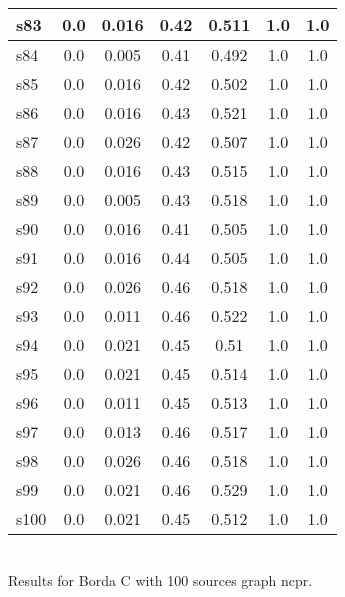 \documentclass{article}
\begin{document}
\begin{tabular}{|l|c|c|c|c|c|c|}
\hline
s83 &0.0 & 0.016 & 0.42 & 0.511 & 1.0 & 1.0\\
\hline
s84 &0.0 & 0.005 & 0.41 & 0.492 & 1.0 & 1.0\\
\hline
s85 &0.0 & 0.016 & 0.42 & 0.502 & 1.0 & 1.0\\
\hline
s86 &0.0 & 0.016 & 0.43 & 0.521 & 1.0 & 1.0\\
\hline
s87 &0.0 & 0.026 & 0.42 & 0.507 & 1.0 & 1.0\\
\hline
s88 &0.0 & 0.016 & 0.43 & 0.515 & 1.0 & 1.0\\
\hline
s89 &0.0 & 0.005 & 0.43 & 0.518 & 1.0 & 1.0\\
\hline
s90 &0.0 & 0.016 & 0.41 & 0.505 & 1.0 & 1.0\\
\hline
s91 &0.0 & 0.016 & 0.44 & 0.505 & 1.0 & 1.0\\
\hline
s92 &0.0 & 0.026 & 0.46 & 0.518 & 1.0 & 1.0\\
\hline
s93 &0.0 & 0.011 & 0.46 & 0.522 & 1.0 & 1.0\\
\hline
s94 &0.0 & 0.021 & 0.45 & 0.51 & 1.0 & 1.0\\
\hline
s95 &0.0 & 0.021 & 0.45 & 0.514 & 1.0 & 1.0\\
\hline
s96 &0.0 & 0.011 & 0.45 & 0.513 & 1.0 & 1.0\\
\hline
s97 &0.0 & 0.013 & 0.46 & 0.517 & 1.0 & 1.0\\
\hline
s98 &0.0 & 0.026 & 0.46 & 0.518 & 1.0 & 1.0\\
\hline
s99 &0.0 & 0.021 & 0.46 & 0.529 & 1.0 & 1.0\\
\hline
s100 &0.0 & 0.021 & 0.45 & 0.512 & 1.0 & 1.0\\
\hline
\end{tabular}\\

\noindent Results for Borda C with 100 sources graph ncpr.
\end{document}
